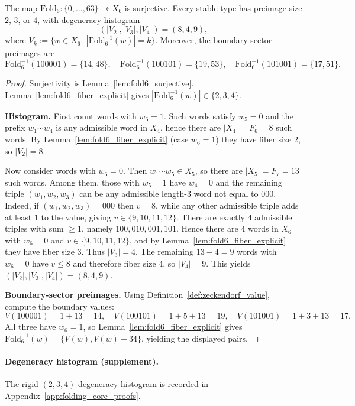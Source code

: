 \begin{theorem}[Finite folding statistics at $m=6$]\label{thm:fold6_stats}
The map $\mathrm{Fold}_6:\{0,\dots,63\}\twoheadrightarrow X_6$ is surjective.
Every stable type has preimage size $2$, $3$, or $4$, with degeneracy histogram
\[
(|V_2|,|V_3|,|V_4|)=(8,4,9),
\]
where $V_k:=\{w\in X_6:\ |\mathrm{Fold}_6^{-1}(w)|=k\}$.
Moreover, the boundary-sector preimages are
\[
\mathrm{Fold}_6^{-1}(100001)=\{14,48\},\quad
\mathrm{Fold}_6^{-1}(100101)=\{19,53\},\quad
\mathrm{Fold}_6^{-1}(101001)=\{17,51\}.
\]
\end{theorem}
\begin{proof}
Surjectivity is Lemma~\ref{lem:fold6_surjective}.
Lemma~\ref{lem:fold6_fiber_explicit} gives $|\mathrm{Fold}_6^{-1}(w)|\in\{2,3,4\}$.

\medskip
\noindent\textbf{Histogram.}
First count words with $w_6=1$.
Such words satisfy $w_5=0$ and the prefix $w_1\cdots w_4$ is any admissible
word in $X_4$, hence there are $|X_4|=F_6=8$ such words.
By Lemma~\ref{lem:fold6_fiber_explicit} (case $w_6=1$) they have fiber size $2$,
so $|V_2|=8$.

Now consider words with $w_6=0$.
Then $w_1\cdots w_5\in X_5$, so there are $|X_5|=F_7=13$ such words.
Among them, those with $w_5=1$ have $w_4=0$ and the remaining triple
$(w_1,w_2,w_3)$ can be any admissible length-$3$ word not equal to $000$.
Indeed, if $(w_1,w_2,w_3)=000$ then $v=8$, while any other admissible triple
adds at least $1$ to the value, giving $v\in\{9,10,11,12\}$.
There are exactly $4$ admissible triples with sum $\ge 1$, namely
$100,010,001,101$.
Hence there are $4$ words in $X_6$ with $w_6=0$ and $v\in\{9,10,11,12\}$, and
by Lemma~\ref{lem:fold6_fiber_explicit} they have fiber size $3$.
Thus $|V_3|=4$.
The remaining $13-4=9$ words with $w_6=0$ have $v\le 8$ and therefore fiber
size $4$, so $|V_4|=9$.
This yields $(|V_2|,|V_3|,|V_4|)=(8,4,9)$.

\medskip
\noindent\textbf{Boundary-sector preimages.}
Using Definition~\ref{def:zeckendorf_value}, compute the boundary values:
\[
V(100001)=1+13=14,\quad V(100101)=1+5+13=19,\quad V(101001)=1+3+13=17.
\]
All three have $w_6=1$, so Lemma~\ref{lem:fold6_fiber_explicit} gives
$\mathrm{Fold}_6^{-1}(w)=\{V(w),V(w)+34\}$, yielding the displayed pairs.
\end{proof}

\paragraph{Degeneracy histogram (supplement).}
The rigid $(2,3,4)$ degeneracy histogram is recorded in Appendix~\ref{app:folding_core_proofs}.

